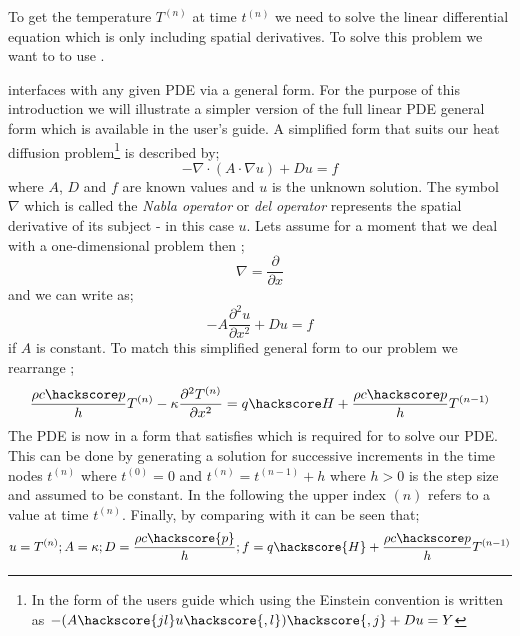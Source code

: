 To get the temperature $T^{(n)}$ at time $t^{(n)}$ we need to solve the linear 
differential equation  which is only including spatial derivatives. To solve this problem
we want to to use \esc. 

\esc interfaces with any given PDE via a general form. For the purpose of this introduction we will illustrate a simpler version of the full linear PDE general form which is available in the \esc user's guide. A simplified form that suits our heat diffusion problem\footnote{In the form of the \esc users guide which using the Einstein convention is written as 
$-(A\hackscore{jl} u\hackscore{,l})\hackscore{,j}+D u =Y$}
is described by;
\begin{equation}\label{eqn:commonform nabla}
-\nabla\cdot(A\cdot\nabla u) + Du = f
\end{equation}
where $A$, $D$ and $f$ are known values and $u$ is the unknown solution. The symbol $\nabla$ which is called the \textit{Nabla operator} or \textit{del operator} represents
the spatial derivative of its subject - in this case $u$. Lets assume for a moment that we deal with a one-dimensional problem then ;
\begin{equation}
\nabla = \frac{\partial}{\partial x}
\end{equation}
and we can write  as;
\begin{equation}\label{eqn:commonform}
-A\frac{\partial^{2}u}{\partial x^{2}} + Du = f
\end{equation}
if $A$ is constant. To match this simplified general form to our problem  
we rearrange ;
\begin{equation}
\frac{\rho c\hackscore p}{h} T^{(n)} - \kappa \frac{\partial^2 T^{(n)}}{\partial x^2} = q\hackscore H +  \frac{\rho c\hackscore p}{h} T^{(n-1)}
\label{eqn:hdgenf}
\end{equation}
The PDE is now in a form that satisfies  which is required for \esc to solve our PDE. This can be done by generating a solution for successive increments in the time nodes $t^{(n)}$ where 
$t^{(0)}=0$ and  $t^{(n)}=t^{(n-1)}+h$ where $h>0$ is the step size and assumed to be constant. 
In the following the upper index ${(n)}$ refers to a value at time $t^{(n)}$. Finally, by comparing  with  it can be seen that;
\begin{equation}\label{ESCRIPT SET}
u=T^{(n)}; 
A = \kappa; D = \frac{\rho c \hackscore{p}}{h}; f = q \hackscore{H} + \frac{\rho c\hackscore p}{h} T^{(n-1)}
\end{equation}

